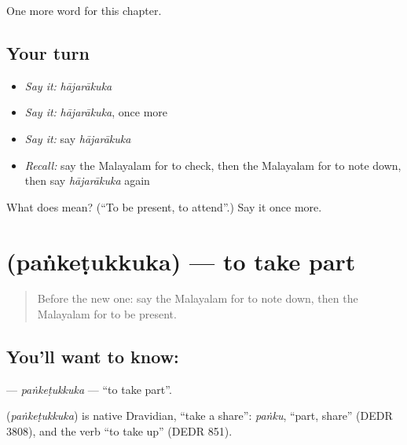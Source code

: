 \begin{grammarlens}[title={What you've built}]
One more word for this chapter.
\end{grammarlens}

\subsection*{Your turn}
\begin{itemize}
\raggedright
  \item \emph{Say it:} \emph{hājarākuka}
  \item \emph{Say it:} \emph{hājarākuka}, once more
  \item \emph{Say it:} say \emph{hājarākuka}
  \item \emph{Recall:} say the Malayalam for to check, then the Malayalam for to note down, then say \emph{hājarākuka} again
\end{itemize}

\begin{tcolorbox}[breakable,colback=teal!4,colframe=teal!35!black,title={Before you move on}]
What does  mean? (\textquotedblleft{}To be present, to attend\textquotedblright{}.) Say it once more.
\end{tcolorbox}
\section[\texorpdfstring{\ml{പങ്കെടുക്കുക} (paṅkeṭukkuka)}{പങ്കെടുക്കുക (paṅkeṭukkuka)}]{ (paṅkeṭukkuka) — to take part}

\label{lesson:ML-C227-panketukkuka}



\begin{quote}
Before the new one: say the Malayalam for to note down, then the Malayalam for to be present.
\end{quote}

\subsection*{You'll want to know: }
\textbf{} — \emph{paṅkeṭukkuka} — \textquotedblleft{}to take part\textquotedblright{}.

\begin{cousinweb}
\textbf{} (\emph{paṅkeṭukkuka}) is native Dravidian, \textquotedblleft{}take a share\textquotedblright{}: \emph{paṅku}, \textquotedblleft{}part, share\textquotedblright{} (DEDR 3808), and the verb \textquotedblleft{}to take up\textquotedblright{} (DEDR 851).
\end{cousinweb}

